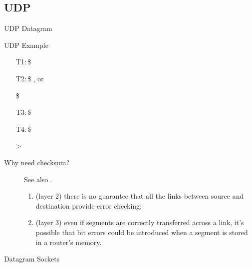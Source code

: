 \subsection{UDP}

\begin{frame}{UDP Datagram}
  \begin{center}
  \end{center}
  \label{fig:udp-datagram-format}
\end{frame}

\begin{frame}{UDP Example}
  \begin{itemize}
  \item[T1:\,\$] 
  \item[T2:\,\$] , or
  \item[\$] 
  \item[T3:\,\$] 
  \item[T4:\,\$] 
  \item[>] 
  \end{itemize}
\end{frame}

\begin{description}
\item[Why need checksum?]  See also .
  \begin{enumerate}
  \item (layer 2) there is no guarantee that all the links between source and destination
    provide error checking;
  \item (layer 3) even if segments are correctly transferred across a link, it's possible
    that bit errors could be introduced when a segment is stored in a router's memory.
  \end{enumerate}
\end{description}

\begin{frame}{Datagram Sockets}
  \centering%
  \mode<beamer>{ \texttt{[image: socket-datagram]} }%
\end{frame}

